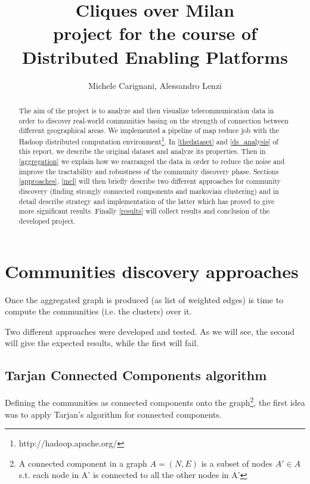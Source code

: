 \documentclass[10pt,a4paper]{article}
\author{Michele Carignani, Alessandro Lenzi}
\title{Cliques over Milan\\project for the course of \\Distributed Enabling Platforms}
\begin{document}
\maketitle
\tableofcontents

\begin{abstract}
The aim of the project is to analyze and then visualize telecommunication data
in order to discover real-world communities basing on the strength of connection
between different geographical areas. We implemented a pipeline of
map reduce job with the Hadoop distributed computation
environment\footnote{http://hadoop.apache.org/}.
In \ref{thedataset} and \ref{ds_analysis} of this report, we describe the original dataset
and analyze its properties. Then in \ref{aggregation}
we explain how we rearranged the data in
order to reduce the noise and improve the tractability and robustness of the
community discovery phase. Sections \ref{approaches}, \ref{mcl} will then
briefly describe two different approaches for community discovery
(finding strongly connected components and markovian clustering)
and in detail describe strategy and implementation of the latter which has
proved to give more significant results.
Finally \ref{results} will collect results and conclusion of the developed project.
\end{abstract}






\section{Communities discovery approaches}
\label{approaches}

Once the aggregated graph is produced (as list of weighted edges) is time to compute
the communities (i.e. the clusters) over it.

Two different approaches were developed and tested. 
As we will see, the second will give the
expected results, while the first will fail.

\subsection{Tarjan Connected Components algorithm}

Defining the communities as connected components onto the graph\footnote{A connected component
in a graph $A = (N,E)$ is a subset of nodes $A' \in A$  s.t. each node in A' is connected to 
all the other nodes in A' 
}, the first idea was to apply Tarjan's algorithm for connected components.
\end{document}
